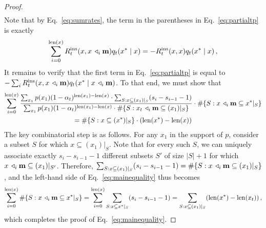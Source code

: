 \begin{proof}
\begin{align}
    \end{align}
    Note that by Eq.~\eqref{eq:sumrates}, the term in the parentheses in Eq.~\eqref{eq:partialtp} is exactly 
    \begin{equation}
        \sum^{\mathrm{len}(x)}_{i=0} R^{\rm ins}_t(x, x\,\triangleleft_{i}\mathbf{m}) q_t(x^* \mid x) = -R^{\rm ins}_t(x, x) q_t(x^*\mid x)\,,
    \end{equation}
    It remains to verify that the first term in Eq.~\eqref{eq:partialtp} is equal to $-\sum_i R^{\rm ins}_t(x,x\,\triangleleft_{i}\mathbf{m}) q_t(x^* \mid x\,\triangleleft_{i}\mathbf{m})$. To that end, we must show that
    \begin{multline}
        \sum^{\mathrm{len}(x)}_{i=0} \frac{\sum_{x_1} p(x_1) (1 - \alpha_t)^{\mathrm{len}(x_1) - \mathrm{len}(x)} \cdot \sum_{S: x\subseteq (x_1)|_S} (s_i - s_{i-1} - 1)}{\sum_{x_1} p(x_1) (1 - \alpha_t)^{\mathrm{len}(x_1) - \mathrm{len}(x)} \cdot \#\{S: x_t\,\triangleleft_{i}\mathbf{m}\subseteq (x_1)|_S\}}\cdot \#\{S: x\,\triangleleft_{i}\mathbf{m}\subseteq x^*|_S\} \\
        =  \#\{S: x\subseteq (x^*)|_S\} \cdot (\mathrm{len}(x^*) - \mathrm{len}(x)) \label{eq:mainequality}
    \end{multline}
    The key combinatorial step is as follows. For any $x_1$ in the support of $p$, consider a subset $S$ for which $x \subseteq (x_1)|_S$. Note that for every such $S$, we can uniquely associate exactly $s_i - s_{i-1} - 1$ different subsets $S'$ of size $|S| + 1$ for which $x\,\triangleleft_{i}\mathbf{m} \subseteq (x_1)|_{S'}$. Therefore, $\sum_{S: x\subseteq (x_1)|_S} (s_i - s_{i-1} - 1) = \#\{S: x\,\triangleleft_{i}\mathbf{m}\subseteq (x_1)|_S\}$, and the left-hand side of Eq.~\eqref{eq:mainequality} thus becomes
    \begin{equation}
        \sum^{\mathrm{len}(x)}_{i=0} \#\{S: x\,\triangleleft_{i}\mathbf{m} \subseteq x^*|_S\} = \sum^{\mathrm{len}(x)}_{i=0} \sum_{S: x\subseteq x^*|_S} (s_i - s_{i-1} - 1) = \sum_{S: x\subseteq (x_1)|_S} (\mathrm{len}(x^*) - \mathrm{len}(x_t))\,,
    \end{equation}
    which completes the proof of Eq.~\eqref{eq:mainequality}.
\end{proof}